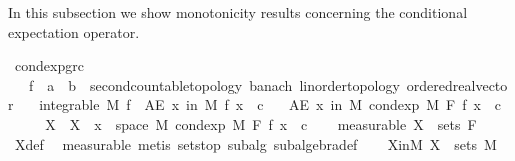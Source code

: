 \begin{isabellebody}
{}
\isamarkuptrue%
%
\endisatagdocument
{\isafolddocument}%
%
\isadelimdocument
%
\endisadelimdocument
%
\begin{isamarkuptext}%
In this subsection we show monotonicity results concerning the conditional expectation operator.%
\end{isamarkuptext}\isamarkuptrue%
\isamarkupfalse%
\ cond{\isacharunderscore}{\kern0pt}exp{\isacharunderscore}{\kern0pt}gr{\isacharunderscore}{\kern0pt}c{\isacharcolon}{\kern0pt}\isanewline
\ \ \ f\ {\isacharcolon}{\kern0pt}{\isacharcolon}{\kern0pt}\ {\isachardoublequoteopen}{\isacharprime}{\kern0pt}a\ {\isasymRightarrow}\ {\isacharprime}{\kern0pt}b\ {\isacharcolon}{\kern0pt}{\isacharcolon}{\kern0pt}\ {\isacharbraceleft}{\kern0pt}second{\isacharunderscore}{\kern0pt}countable{\isacharunderscore}{\kern0pt}topology{\isacharcomma}{\kern0pt}\ banach{\isacharcomma}{\kern0pt}\ linorder{\isacharunderscore}{\kern0pt}topology{\isacharcomma}{\kern0pt}\ ordered{\isacharunderscore}{\kern0pt}real{\isacharunderscore}{\kern0pt}vector{\isacharbraceright}{\kern0pt}{\isachardoublequoteclose}\isanewline
\ \ \ {\isachardoublequoteopen}integrable\ M\ f{\isachardoublequoteclose}\ \ {\isachardoublequoteopen}AE\ x\ in\ M{\isachardot}{\kern0pt}\ f\ x\ {\isachargreater}{\kern0pt}\ c{\isachardoublequoteclose}\isanewline
\ \ \ {\isachardoublequoteopen}AE\ x\ in\ M{\isachardot}{\kern0pt}\ cond{\isacharunderscore}{\kern0pt}exp\ M\ F\ f\ x\ {\isachargreater}{\kern0pt}\ c{\isachardoublequoteclose}\isanewline
%
\isadelimproof
%
\endisadelimproof
%
\isatagproof
{}\isamarkupfalse%
\ {\isacharminus}{\kern0pt}\isanewline
\ \ \isamarkupfalse%
\ X\ \ {\isachardoublequoteopen}X\ {\isacharequal}{\kern0pt}\ {\isacharbraceleft}{\kern0pt}x\ {\isasymin}\ space\ M{\isachardot}{\kern0pt}\ cond{\isacharunderscore}{\kern0pt}exp\ M\ F\ f\ x\ {\isasymle}\ c{\isacharbraceright}{\kern0pt}{\isachardoublequoteclose}\isanewline
\ \ \isamarkupfalse%
\ {\isacharbrackleft}{\kern0pt}measurable{\isacharbrackright}{\kern0pt}{\isacharcolon}{\kern0pt}\ {\isachardoublequoteopen}X\ {\isasymin}\ sets\ F{\isachardoublequoteclose}\ \isamarkupfalse%
\ X{\isacharunderscore}{\kern0pt}def\ \isamarkupfalse%
\ measurable\ {\isacharparenleft}{\kern0pt}metis\ sets{\isachardot}{\kern0pt}top\ subalg\ subalgebra{\isacharunderscore}{\kern0pt}def{\isacharparenright}{\kern0pt}\isanewline
\ \ \isamarkupfalse%
\ X{\isacharunderscore}{\kern0pt}in{\isacharunderscore}{\kern0pt}M{\isacharcolon}{\kern0pt}\ {\isachardoublequoteopen}X\ {\isasymin}\ sets\ M{\isachardoublequoteclose}\ \isamarkupfalse%

\end{isabellebody}
